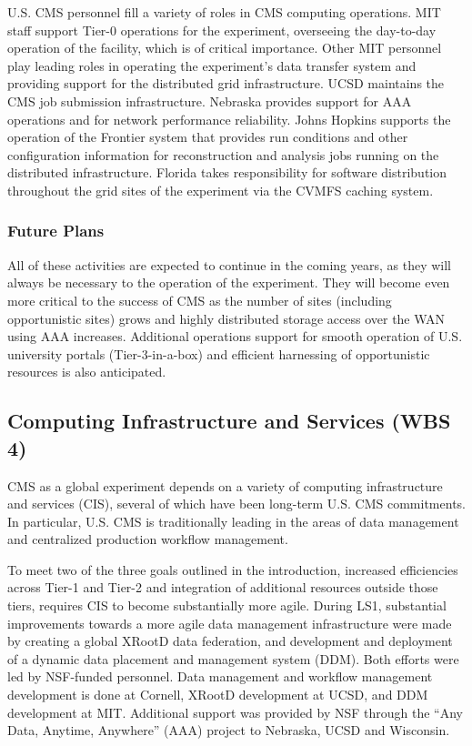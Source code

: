 \documentclass[11pt,a4paper]{article}
\begin{document}
U.S. CMS personnel fill a variety of roles in CMS computing operations.
MIT staff support Tier-0 operations for the experiment, overseeing the
day-to-day operation of the facility, which is of critical importance.  Other 
MIT personnel play leading roles in
operating the experiment's data transfer system and providing support for
the distributed grid infrastructure.  UCSD maintains the CMS job submission
infrastructure.  Nebraska provides support for AAA operations and for
network performance reliability.  Johns Hopkins supports the operation of
the Frontier system that provides run conditions and other configuration
information for reconstruction and analysis jobs running on the distributed
infrastructure.  Florida takes responsibility for software distribution
throughout the grid sites of the experiment via the CVMFS caching system.

\subsubsection{Future Plans}

All of these activities are expected to continue in the coming years, as
they will always be necessary to the operation of the experiment.  They
will become even more critical to the success of CMS as the number of sites
(including opportunistic sites) grows and highly distributed storage access
over the WAN using AAA increases.  Additional operations support for smooth
operation of U.S. university portals (Tier-3-in-a-box) and efficient
harnessing of opportunistic resources is also anticipated.

\subsection{Computing Infrastructure and Services (WBS 4)}

CMS as a global experiment depends on a variety of computing infrastructure
and services (CIS), several of which have been long-term U.S. CMS
commitments. In particular, U.S. CMS is traditionally leading in the areas of
data management and centralized production workflow management.

To meet two of the three goals outlined in the introduction, increased
efficiencies across Tier-1 and Tier-2 and integration of additional
resources outside those tiers, requires CIS to become substantially more
agile.  During LS1, substantial improvements towards a more agile data
management infrastructure were made by creating a global XRootD data
federation, and development and deployment of a dynamic data placement and
management system (DDM).  Both efforts were led by NSF-funded
personnel. Data management and workflow management development is done at
Cornell, XRootD development at UCSD, and DDM development at MIT.
Additional support was provided by NSF through the ``Any Data, Anytime,
Anywhere'' (AAA) project to Nebraska, UCSD and Wisconsin.
\end{document}
